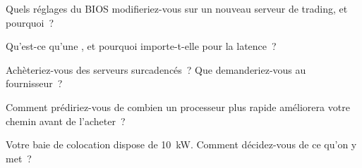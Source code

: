 \begin{interviewq}\label{iq:nw:servers:2}
Quels réglages du BIOS modifieriez-vous sur un nouveau serveur de trading, et pourquoi~?
\end{interviewq}

\begin{interviewq}\label{iq:nw:servers:3}
Qu'est-ce qu'une , et pourquoi importe-t-elle pour la latence~?
\end{interviewq}

\begin{interviewq}\label{iq:nw:servers:4}
Achèteriez-vous des serveurs surcadencés~? Que demanderiez-vous au fournisseur~?
\end{interviewq}

\begin{interviewq}\label{iq:nw:servers:5}
Comment prédiriez-vous de combien un processeur plus rapide améliorera votre chemin avant de l'acheter~?
\end{interviewq}

\begin{interviewq}\label{iq:nw:servers:6}
Votre baie de colocation dispose de \qty{10}{\kilo\watt}. Comment décidez-vous de ce qu'on y met~?
\end{interviewq}
